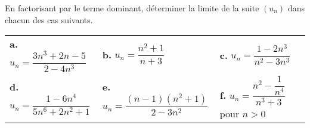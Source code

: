 \documentclass[11pt,fleqn]{book} %
\begin{document}
\begin{exercise}[topic=lim03]En factorisant par le terme dominant, déterminer la limite de la suite $(u_n)$ dans chacun des cas suivants.
\begin{center}
\renewcommand{\arraystretch}{2.5}
\begin{tabularx}{\linewidth}{XXXX}
\textbf{a.} $ u_n = \dfrac{3n^3+2n-5}{2-4n^3}$ & \textbf{b.} $ u_n = \dfrac{n^2+1}{n+3}$ & \textbf{c.} $u_n=\dfrac{1-2n^3}{n^2-3n^3}$ \\
\textbf{d.} $u_n = \dfrac{1-6n^4}{5n^6+2n^2+1}$ & \textbf{e.} $u_n=\dfrac{(n-1)(n^2+1)}{2-3n^2}$ & \textbf{f.} $ u_n = \dfrac{n^2-\dfrac{1}{n^4}}{n^3+3}$  pour $n>0$ 

\end{tabularx}
\end{center}
\newpage
\end{exercise}
\end{document}
